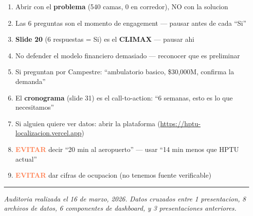 \documentclass[11pt, a4paper]{article}
\newcommand{\dg}[1]{\textcolor{coral}{\textbf{#1}}}
\begin{document}
\begin{enumerate}[leftmargin=*, itemsep=4pt]
  \item[$\square$] Abrir con el \textbf{problema} (540 camas, 0 en corredor), NO con la solucion
  \item[$\square$] Las 6 preguntas son el momento de engagement --- pausar antes de cada ``Si''
  \item[$\square$] \textbf{Slide 20} (6 respuestas = Si) es el \textbf{CLIMAX} --- pausar ahi
  \item[$\square$] No defender el modelo financiero demasiado --- reconocer que es preliminar
  \item[$\square$] Si preguntan por Campestre: ``ambulatorio basico, \$30,000M, confirma la demanda''
  \item[$\square$] El \textbf{cronograma} (slide 31) es el call-to-action: ``6 semanas, esto es lo que necesitamos''
  \item[$\square$] Si alguien quiere ver datos: abrir la plataforma (\url{https://hptu-localizacion.vercel.app})
  \item[$\square$] \dg{EVITAR} decir ``20 min al aeropuerto'' --- usar ``14 min menos que HPTU actual''
  \item[$\square$] \dg{EVITAR} dar cifras de ocupacion (no tenemos fuente verificable)
\end{enumerate}

\vfill
\begin{center}
{\color{hptu}\rule{0.6\textwidth}{1pt}}

\vspace{6pt}
{\small\color{slate}\textit{Auditoria realizada el 16 de marzo, 2026. Datos cruzados entre 1 presentacion, 8 archivos de datos, 6 componentes de dashboard, y 3 presentaciones anteriores.}}
\end{center}
\end{document}
